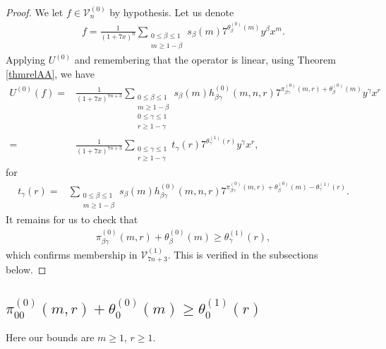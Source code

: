 \documentclass[reqno]{amsart}
\theoremstyle{definition}
\theoremstyle{remark}
\numberwithin{equation}{section}
\begin{document}
\begin{proof}

We let $f\in\mathcal{V}^{(0)}_n$ by hypothesis.  Let us denote
\begin{align*}
f=\frac{1}{(1+7x)^n}\sum_{\substack{0\le\beta\le 1\\ m\ge 1-\beta}}s_{\beta}(m)7^{\theta^{(0)}_{\beta}(m)}y^{\beta}x^m.
\end{align*}  
Applying $U^{(0)}$ and remembering that the operator is linear, using Theorem \ref{thmrelAA}, we have
\begin{align}
U^{(0)}\left( f \right) =& \frac{1}{(1+7x)^{7n+3}}\sum_{\substack{0\le\beta\le 1\\ m\ge 1-\beta\\ 0\le\gamma\le 1\\ r\ge 1-\gamma}} s_{\beta}(m)h^{(0)}_{\beta\gamma}(m,n,r) 7^{\pi^{(0)}_{\beta\gamma}(m,r)+\theta^{(0)}_{\beta}(m)}y^{\gamma}x^r\label{u23fsad}\\
=& \frac{1}{(1+7x)^{7n+3}}\sum_{\substack{0\le\gamma\le 1\\ r\ge 1-\gamma}} t_{\gamma}(r) 7^{\theta^{(1)}_{\gamma}(r)}y^{\gamma}x^r,
\end{align} for
\begin{align*}
t_{\gamma}(r) =& \sum_{\substack{0\le\beta\le 1\\ m\ge 1-\beta}} s_{\beta}(m)h^{(0)}_{\beta\gamma}(m,n,r) 7^{\pi^{(0)}_{\beta\gamma}(m,r)+\theta^{(0)}_{\beta}(m)-\theta^{(1)}_{\gamma}(r)}.
\end{align*}  It remains for us to check that
\begin{align*}
\pi^{(0)}_{\beta\gamma}(m,r)+\theta^{(0)}_{\beta}(m)\ge \theta^{(1)}_{\gamma}(r),
\end{align*} which confirms membership in $\mathcal{V}^{(1)}_{7n+3}$.  This is verified in the subsections below.

\end{proof}

\subsection{$\displaystyle{\pi^{(0)}_{00}(m,r)+\theta^{(0)}_0(m)\ge \theta^{(1)}_0(r)}$}

Here our bounds are $m\ge 1$, $r\ge 1$.\\
\end{document}
